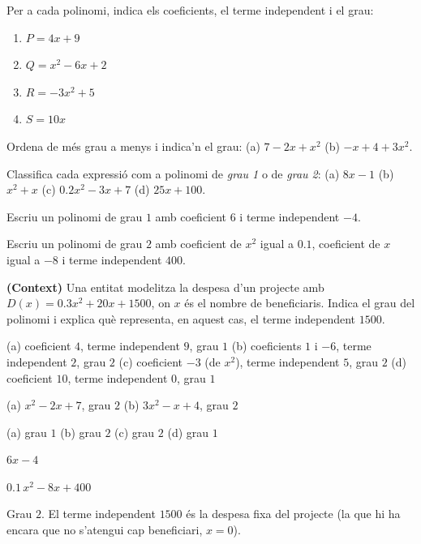 \begin{exercicis}
\begin{exlist}
  \item Per a cada polinomi, indica els coeficients, el terme independent i el grau:
    \begin{enumerate}[label=\alph*), leftmargin=1.6em, topsep=2pt]
      \item $P = 4x + 9$
      \item $Q = x^2 - 6x + 2$
      \item $R = -3x^2 + 5$
      \item $S = 10x$
    \end{enumerate}
  \item Ordena de més grau a menys i indica'n el grau:
    \quad (a) $7 - 2x + x^2$ \quad (b) $-x + 4 + 3x^2$.
  \item Classifica cada expressió com a polinomi de \emph{grau 1} o de \emph{grau 2}:
    \quad (a) $8x-1$ \quad (b) $x^2+x$ \quad (c) $\num{0,2}x^2-3x+7$ \quad (d) $25x+100$.
  \item Escriu un polinomi de grau $1$ amb coeficient $6$ i terme independent $-4$.
  \item Escriu un polinomi de grau $2$ amb coeficient de $x^2$ igual a $\num{0,1}$,
        coeficient de $x$ igual a $-8$ i terme independent $400$.
  \item \textbf{(Context)} Una entitat modelitza la despesa d'un projecte amb
        $D(x) = \num{0,3}x^2 + 20x + \num{1500}$, on $x$ és el nombre de
        beneficiaris. Indica el grau del polinomi i explica què representa,
        en aquest cas, el terme independent $\num{1500}$.
\end{exlist}
\end{exercicis}

\begin{solucions}
\begin{sollist}
  \item (a) coeficient $4$, terme independent $9$, grau $1$ \quad
        (b) coeficients $1$ i $-6$, terme independent $2$, grau $2$ \quad
        (c) coeficient $-3$ (de $x^2$), terme independent $5$, grau $2$ \quad
        (d) coeficient $10$, terme independent $0$, grau $1$
  \item (a) $x^2 - 2x + 7$, grau $2$ \quad (b) $3x^2 - x + 4$, grau $2$
  \item (a) grau $1$ \quad (b) grau $2$ \quad (c) grau $2$ \quad (d) grau $1$
  \item $6x - 4$
  \item $\num{0,1}\,x^2 - 8x + 400$
  \item Grau $2$. El terme independent $\num{1500}$ és la despesa fixa del
        projecte (la que hi ha encara que no s'atengui cap beneficiari, $x=0$).
\end{sollist}
\end{solucions}
